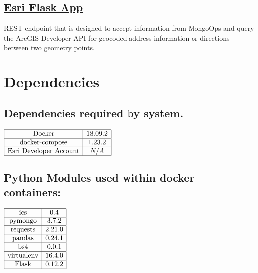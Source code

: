 \subsection{\href{https://github.com/apjansing/Open-House-Route-Planner/blob/master/backend/docker/persistence/esri/esri_flask.py}{Esri Flask App}} \label{Esri Flask App}

REST endpoint that is designed to accept information from MongoOps and query the ArcGIS Developer API for geocoded address information or directions between two geometry points.
  


\section{Dependencies}
\subsection{Dependencies required by system.}
$
\begin{array}{|c|c|}
  \hline
  \text{Docker} & 18.09.2 \\\hline
  \text{docker-compose} & 1.23.2 \\\hline
  \text{Esri Developer Account} & N/A \\
  \hline
\end{array}
$

\subsection{Python Modules used within docker containers:}
$
\begin{array}{|c|c|}
  \hline
  \text{ics} & 0.4\\\hline
  \text{pymongo} & 3.7.2 \\\hline
  \text{requests} & 2.21.0 \\\hline
  \text{pandas} & 0.24.1 \\\hline
  \text{bs4} & 0.0.1 \\\hline
  \text{virtualenv} & 16.4.0 \\\hline
  \text{Flask} & 0.12.2 \\
  \hline
\end{array}
$